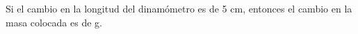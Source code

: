 Si el cambio en la longitud del dinamómetro es de 5 cm, entonces el cambio en la masa colocada es de \fillin[10][0.5cm] g.
